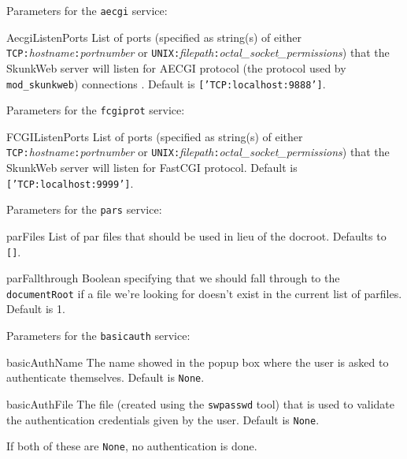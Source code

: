 \documentclass[titlepage]{manual}
\begin{document}
Parameters for the \texttt{aecgi} service:
\begin{argdesc}
\item[AecgiListenPorts] \nonscope
List of ports (specified as string(s) of either
\texttt{TCP:}\emph{hostname}\texttt{:}\emph{portnumber} or
\texttt{UNIX:}\emph{filepath}\texttt{:}\emph{octal_socket_permissions})
that the SkunkWeb server will listen for AECGI protocol (the protocol used
by \texttt{mod\_skunkweb}) connections .
Default is \texttt{['TCP:localhost:9888']}.
\end{argdesc}

Parameters for the \texttt{fcgiprot} service:
\begin{argdesc}
\item[FCGIListenPorts] \nonscope
List of ports (specified as string(s) of either
\texttt{TCP:}\emph{hostname}\texttt{:}\emph{portnumber} or
\texttt{UNIX:}\emph{filepath}\texttt{:}\emph{octal_socket_permissions})
that the SkunkWeb server will listen for FastCGI protocol.
Default is \texttt{['TCP:localhost:9999']}.
\end{argdesc}


Parameters for the \texttt{pars} service:
\begin{argdesc}
\item[parFiles] List of par files that should be used in lieu of the
docroot.  Defaults to \texttt{[]}.
\item[parFallthrough] Boolean specifying that we should fall through
to the \texttt{documentRoot} if a file we're looking for doesn't exist
in the current list of parfiles.  Default is 1.
\end{argdesc}



Parameters for the \texttt{basicauth} service:
\begin{argdesc}
\item[basicAuthName] The name showed in the popup box where the user is asked to authenticate themselves.  Default is \texttt{None}.
\item[basicAuthFile] The file (created using the \texttt{swpasswd} tool) that is used to validate the authentication credentials given by the user.  Default is \texttt{None}.
\end{argdesc}
If both of these are \texttt{None}, no authentication is done.
\end{document}
